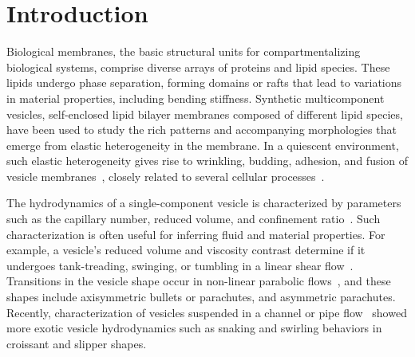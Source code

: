 \documentclass[twoside,twocolumn,9pt]{article}
\begin{document}



\section{\label{sec:Introduction}Introduction}
Biological membranes, the basic structural units for compartmentalizing
biological systems, 
comprise diverse arrays of
proteins and lipid species. 
These lipids undergo phase separation, forming domains or rafts that
lead to variations in material properties, including bending stiffness.
Synthetic multicomponent vesicles, self-enclosed lipid bilayer membranes
composed of different lipid species, have been used to study the rich
patterns and accompanying morphologies that emerge from elastic
heterogeneity in the membrane. In a quiescent environment, such elastic
heterogeneity gives rise to wrinkling, budding, adhesion, and fusion of
vesicle membranes~\cite{Lowengrub2009_PRE, Li2012_CommMathSci,
Zhao2011_PRE}, closely related to several cellular
processes~\cite{Rauch2000_BiophysJ, Takeda2003_PNAS}.

The hydrodynamics of a single-component vesicle is characterized by
parameters such as the capillary number, reduced volume, and confinement
ratio~\cite{Abreu2014_ACI}. Such characterization is often useful for
inferring fluid and material properties.
For example, a vesicle's reduced volume and viscosity contrast determine
if it undergoes tank-treading, swinging, or tumbling in a linear shear
flow~\cite{nog-gom2005}. Transitions in the vesicle shape occur in
non-linear parabolic flows~\cite{kao-bir-mis2009, dan-vla-mis2009}, and
these shapes include axisymmetric bullets or parachutes, and asymmetric
parachutes. Recently, characterization of vesicles suspended in a
channel or pipe flow~\cite{lyu-che-far-jae-mis-leo2023, aga-bir2020,
qua-gan-you2021, abb-far-nai-ezz-ben-mis2022,
wan-ii-sug-nod-jin-liu-che-gon2023} showed more exotic vesicle
hydrodynamics such as snaking and swirling behaviors in croissant and
slipper shapes.
\end{document}
